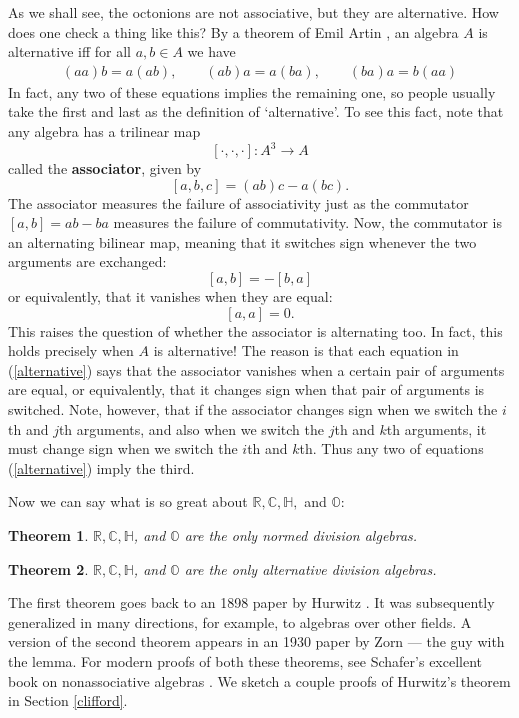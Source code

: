 \documentclass[12pt]{article}
\newcommand\R{{\mathbb R}}
\newcommand\C{{\mathbb C}}
\renewcommand\H{{\mathbb H}}
\renewcommand\O{{\mathbb O}}
\newcommand{\et}{\hspace{-0.08in}{\bf .}\hspace{0.1in}}
\newcommand{\ba}{\begin{eqnarray}}
\newcommand{\ea}{\end{eqnarray}}
\newcommand{\maps}{\colon}
\newtheorem{thm}{Theorem}
\begin{document}
As we shall see, the octonions are not associative, but they are alternative.   
How does one check a thing like this?  By a theorem of Emil Artin    
\cite{Schafer}, an algebra $A$ is alternative iff for all $a,b \in A$ we have   
\ba  (aa)b = a(ab), \qquad (ab)a = a(ba), \qquad (ba)a = b(aa)    
\label{alternative}   \ea   
In fact, any two of these equations implies the remaining one, so people   
usually take the first and last as the definition of `alternative'.   
To see this fact, note that any algebra has a trilinear map    
\[  [\cdot,\cdot,\cdot] \maps A^3 \to A  \]   
called the {\bf associator}, given by   
\[               [a,b,c] = (ab)c - a(bc)   .\]   
The associator measures the failure of associativity just as the 
commutator $[a,b] = ab - ba$ measures the failure of commutativity.   
Now, the commutator is an alternating bilinear map, meaning that it 
switches sign whenever the two arguments are exchanged:   
\[         [a,b] = -[b,a]   \]   
or equivalently, that it vanishes when they are equal:   
\[         [a,a] = 0 .\]   
This raises the question of whether the associator is alternating too.     
In fact, this holds precisely when $A$ is alternative!  The reason is   
that each equation in (\ref{alternative}) says that the associator   
vanishes when a certain pair of arguments are equal, or equivalently,   
that it changes sign when that pair of arguments is switched.  Note,   
however, that if the associator changes sign when we switch the $i$th   
and $j$th arguments, and also when we switch the $j$th and $k$th   
arguments, it must change sign when we switch the $i$th and $k$th.      
Thus any two of equations (\ref{alternative}) imply the third.     
   
Now we can say what is so great about $\R,\C,\H,$ and $\O$:   
 
\begin{thm}  \et \label{hurwitz} 
$\R,\C,\H$, and $\O$ are the only normed division algebras.  
\end{thm}  
 
\begin{thm} \et \label{zorn}   
$\R,\C,\H$, and $\O$ are the only alternative division algebras.   
\end{thm}   
   
The first theorem goes back to an 1898 paper by Hurwitz \cite{Hurwitz}. 
It was subsequently generalized in many directions, for example, to  
algebras over other fields.   A version of the second theorem appears in
an 1930 paper by Zorn \cite{Zorn} --- the guy with the lemma.  For
modern proofs of both these theorems, see Schafer's excellent book on
nonassociative algebras \cite{Schafer}.  We sketch a couple proofs of
Hurwitz's theorem in Section \ref{clifford}.  
\end{document}
